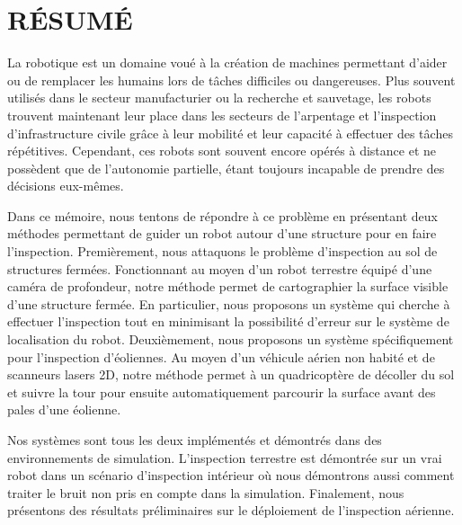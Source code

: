 %
%
\chapter*{RÉSUMÉ}\thispagestyle{headings}

La robotique est un domaine voué à la création de machines permettant d'aider
ou de remplacer les humains lors de tâches difficiles ou dangereuses. Plus souvent
utilisés dans le secteur manufacturier ou la recherche et sauvetage, les robots
trouvent maintenant leur place dans les secteurs de l'arpentage et l'inspection
d'infrastructure civile grâce à leur mobilité et leur capacité à effectuer des
tâches répétitives. Cependant, ces robots sont souvent encore opérés à distance
et ne possèdent que de l'autonomie partielle, étant toujours incapable de prendre
des décisions eux-mêmes.

Dans ce mémoire, nous tentons de répondre à ce problème en présentant deux
méthodes permettant de guider un robot autour d'une structure pour en faire
l'inspection. Premièrement, nous attaquons le problème d'inspection au sol de
structures fermées. Fonctionnant au moyen d'un robot terrestre équipé d'une
caméra de profondeur, notre méthode permet de cartographier la surface visible
d'une structure fermée. En particulier, nous proposons un système qui cherche
à effectuer l'inspection tout en minimisant la possibilité d'erreur sur le système
de localisation du robot. Deuxièmement, nous proposons un système spécifiquement
pour l'inspection d'éoliennes. Au moyen d'un véhicule aérien
non habité et de scanneurs lasers 2D, notre méthode permet à un quadricoptère de décoller
du sol et suivre la tour pour ensuite automatiquement parcourir la surface avant
des pales d'une éolienne.

Nos systèmes sont tous les deux implémentés et démontrés dans des environnements
de simulation. L'inspection terrestre est démontrée sur un vrai robot dans un
scénario d'inspection intérieur où nous démontrons aussi comment traiter le bruit
non pris en compte dans la simulation.
Finalement, nous présentons des résultats préliminaires
sur le déploiement de l'inspection aérienne.
